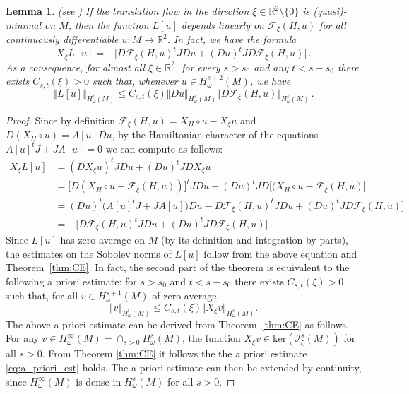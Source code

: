 \documentclass[11pt]{amsart}
\newcommand \R {{ \mathbb R}}
\newtheorem {lemma} [theorem]{Lemma}
\begin{document}
\begin{lemma} (see \cite[Lemma 19]{LGJV05}) \label{lemma:L} If the translation flow in the direction $\xi \in \R^2\setminus \{0\}$ is (quasi)-minimal  on $M$, 
then the function $L[u]$ depends linearly on $\mathcal{F}_\xi(H, u)$ for all continuously differentiable $u:M \to \R^2$.
In fact, we have the formula
$$
X_\xi L[u]  = - \Big[D \mathcal{F}_\xi(H, u)^t J Du + (Du)^t J D\mathcal{F}_\xi(H, u) \Big] \,.
$$
As a consequence, for almost all $\xi \in \R^2$, for every $s>s_0$  and any $t<s-s_0$ there exists $C_{s,t}(\xi) >0$ such that, 
whenever $u \in H^{s+2}_\omega (M)$, we have 
$$
\Vert L[u] \Vert _{H^t_\omega(M)}  \leq   C_{s,t}(\xi)  \Vert Du \Vert_{H^s_\omega(M)} \Vert D\mathcal{F}_\xi(H, u)  \Vert_{H^s_\omega(M)} \,.
$$
\end{lemma} 
\begin{proof} 
Since by definition $\mathcal{F}_\xi(H, u)  = X_H \circ u - X_\xi u$  and $D (X_H \circ u) = A[u] Du$, by the Hamiltonian character of the equations
$ A[u]^t J  + J A[u] =0$ we can compute as follows:
$$
\begin{aligned}
X_\xi L[u] &= (D X_\xi u)^t J Du +  (Du)^t J D X_\xi u  \\ & =  \Big[D(X_H\circ u - \mathcal{F}_\xi(H, u) )\Big]^t J Du + 
(Du)^t J D \Big [ (X_H \circ u -\mathcal{F}_\xi(H, u)\Big] 
 \\ & =   (Du)^t  \Big ( A[u]^t J + J A[u] \Big) Du -  D \mathcal{F}_\xi(H, u)^t J Du + (Du)^t J D\mathcal{F}_\xi(H, u) \Big]
 \\& = - \Big[D \mathcal{F}_\xi(H, u)^t J Du + (Du)^t J D\mathcal{F}_\xi(H, u) \Big]     \,.
\end{aligned}
$$
Since $L[u]$ has zero average on $M$ (by its definition and integration by parts), the estimates on the Sobolev norms of $L[u]$ follow from the above equation and Theorem~\ref{thm:CE}. In fact, the second part
of  the theorem is equivalent to the following a priori estimate: for $s>s_0$ and $t<s-s_0$ there exists $C_{s,t}(\xi)>0$ such that, for all $v \in H^{s+1}_\omega(M)$ of zero average,
\begin{equation}
\label{eq:a_priori_est}
\Vert  v \Vert_{H^t_\omega(M)} \leq C_{s,t}(\xi) \Vert X_\xi v \Vert_{H^s_\omega(M)}.
\end{equation}
The above a priori estimate can be derived from Theorem~\ref{thm:CE} as follows. For any $v \in H^\infty_\omega (M) = \cap_{s>0} H^s_\omega(M)$,
the function $X_\xi v \in \text{ker}(\mathcal I^s_\xi(M))$ for all $s >0$.  From Theorem \ref{thm:CE} it follows the the a priori estimate  \eqref{eq:a_priori_est}
holds. The a priori estimate can then be extended by continuity, since $H^\infty_\omega (M)$ is dense in $H^s_\omega(M)$ for all $s>0$.


\end{proof}
\end{document}
